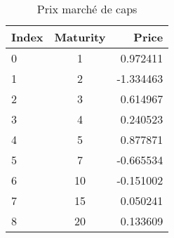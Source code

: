 \begin{table}
    \centering
\begin{tabular}{|l|c|r|}

  \hline
  Index&Maturity&Price \\
  \hline
  0&1&0.972411 \\
  1&2&-1.334463 \\
  2&3&0.614967 \\
  3&4&0.240523 \\
  4&5&0.877871 \\
  5&7&-0.665534 \\
  6&10&-0.151002 \\
  7&15&0.050241 \\
  8&20&0.133609 \\
  \hline
\end{tabular}
\caption{Prix marché de caps}
\end{table}
